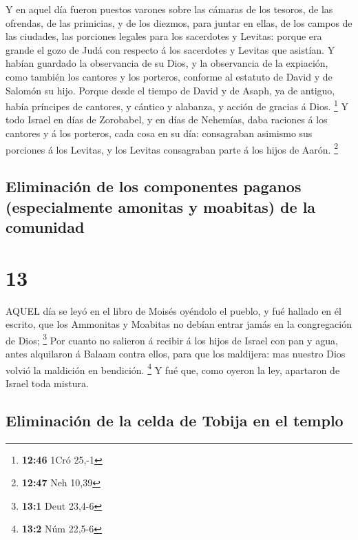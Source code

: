  Y en aquel día fueron puestos varones sobre las cámaras de
los tesoros, de las ofrendas, de las primicias, y de los diezmos, para
juntar en ellas, de los campos de las ciudades, las porciones legales
para los sacerdotes y Levitas: porque era grande el gozo de Judá con
respecto á los sacerdotes y Levitas que asistían.  Y habían
guardado la observancia de su Dios, y la observancia de la expiación,
como también los cantores y los porteros, conforme al estatuto de David
y de Salomón su hijo.  Porque desde el tiempo de David y de
Asaph, ya de antiguo, había príncipes de cantores, y cántico y alabanza,
y acción de gracias á Dios. \footnote{\textbf{12:46} 1Cró 25,-1}
 Y todo Israel en días de Zorobabel, y en días de Nehemías,
daba raciones á los cantores y á los porteros, cada cosa en su día:
consagraban asimismo sus porciones á los Levitas, y los Levitas
consagraban parte á los hijos de Aarón. \footnote{\textbf{12:47} Neh
  10,39}

\hypertarget{eliminaciuxf3n-de-los-componentes-paganos-especialmente-amonitas-y-moabitas-de-la-comunidad}{%
\subsection{Eliminación de los componentes paganos (especialmente
amonitas y moabitas) de la
comunidad}\label{eliminaciuxf3n-de-los-componentes-paganos-especialmente-amonitas-y-moabitas-de-la-comunidad}}

\hypertarget{section-12}{%
\section{13}\label{section-12}}

 AQUEL día se leyó en el libro de Moisés oyéndolo el pueblo,
y fué hallado en él escrito, que los Ammonitas y Moabitas no debían
entrar jamás en la congregación de Dios; \footnote{\textbf{13:1} Deut
  23,4-6}  Por cuanto no salieron á recibir á los hijos de
Israel con pan y agua, antes alquilaron á Balaam contra ellos, para que
los maldijera: mas nuestro Dios volvió la maldición en bendición.
\footnote{\textbf{13:2} Núm 22,5-6}  Y fué que, como oyeron
la ley, apartaron de Israel toda mistura.

\hypertarget{eliminaciuxf3n-de-la-celda-de-tobija-en-el-templo}{%
\subsection{Eliminación de la celda de Tobija en el
templo}\label{eliminaciuxf3n-de-la-celda-de-tobija-en-el-templo}}

